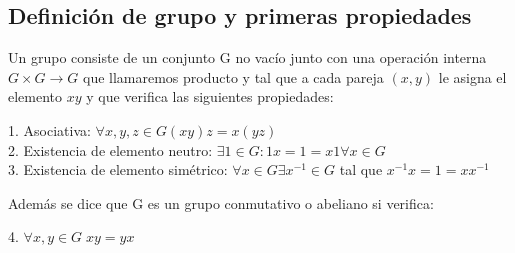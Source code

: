 \subsection{Definición de grupo y primeras propiedades}

\begin{definition}
Un grupo consiste de un conjunto G no vacío junto con una operación interna $G \times G \rightarrow G$ que llamaremos producto y tal que a cada pareja $(x,y)$ le asigna el elemento $xy$ y que verifica las siguientes propiedades:

1. Asociativa: $\forall x,y,z \in G (xy)z = x(yz)$ \\
2. Existencia de elemento neutro: $\exists 1 \in G : 1x = 1 = x1 \forall x \in G$ \\
3. Existencia de elemento simétrico: $\forall x \in G \exists x^{-1} \in G$ tal que $x^{-1}x = 1 = xx^{-1}$ 

Además se dice que G es un grupo conmutativo o abeliano si verifica:

4. $\forall x,y \in G \; xy = yx$
\end{definition}

